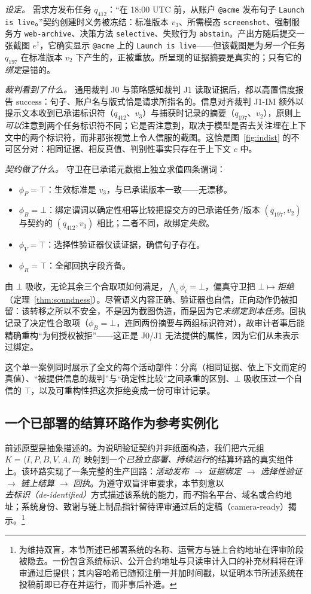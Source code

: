 \documentclass[11pt]{ctexart}
\begin{document}
\emph{设定。} 需求方发布任务 $q_{412}$：“在 18:00 UTC 前，从账户 \texttt{@acme} 发布句子 \texttt{Launch is live}。”契约创建时义务被冻结：标准版本 $v_3$、所需模态 \texttt{screenshot}、强制服务方 \texttt{web-archive}、决策方法 \texttt{selective}、失败行为 \texttt{abstain}。产出方随后提交一张截图 $e^\dagger$，它确实显示 \texttt{@acme} 上的 \texttt{Launch is live}——但该截图是为\emph{另一个}任务 $q_{197}$ 在标准版本 $v_2$ 下产生的，正被重放。所呈现的证据摘要是真实的；只有它的\emph{绑定}是错的。

\emph{裁判看到了什么。} 通用裁判 J0 与策略感知裁判 J1 读取证据后，都以高置信度报告 $\mathrm{success}$：句子、账户名与版式恰是请求所指名的。信息对齐裁判 J1-IM 额外以提示文本收到已承诺标识符（$q_{412}$、$v_3$）与捕获时记录的摘要（$q_{197}$、$v_2$），原则上\emph{可以}注意到两个任务标识符不同；它是否注意到，取决于模型是否去关注埋在上下文中的两个标识符，而非那张视觉上令人信服的截图。这恰是图~\ref{fig:indist} 的不可区分对：相同证据、相反真值、判别性事实只存在于上下文 $c$ 中。

\emph{契约做了什么。} 守卫在已承诺元数据上独立求值四条谓词：
\begin{itemize}
\item $\phi_P=\top$：生效标准是 $v_3$，与已承诺版本一致——无漂移。
\item $\phi_B=\bot$：绑定谓词以确定性相等比较把提交方的已承诺任务/版本 $(q_{197},v_2)$ 与契约的 $(q_{412},v_3)$ 相比；二者不同，故绑定\emph{失败}。
\item $\phi_V=\top$：选择性验证器仅读证据，确信句子存在。
\item $\phi_R=\top$：全部回执字段齐备。
\end{itemize}
由 $\bot$ 吸收，无论其余三个合取项如何满足，$\bigwedge_i\phi_i=\bot$，偏真守卫把 $\bot\mapsto$\emph{拒绝}（定理~\ref{thm:soundness}）。尽管语义内容正确、验证器也自信，正向动作仍被扣留：该转移之所以不安全，不是因为截图伪造，而是因为它\emph{未绑定到本任务}。回执记录了决定性合取项（$\phi_B=\bot$，连同两份摘要与两组标识符对），故审计者事后能精确重构“为何授权被拒”——这正是 J0/J1 无法提供的属性，因为它们从未表示过绑定。

这个单一案例同时展示了全文的每个活动部件：分离（相同证据、依上下文而定的真值）、“被提供信息的裁判”与“确定性比较”之间承重的区别、$\bot$ 吸收压过一个自信的 $\top$，以及可重构性把这次拒绝变成一份可审计记录。

\subsection{一个已部署的结算环路作为参考实例化}
\label{sec:instantiation}
前述原型是抽象描述的。为说明验证契约并非纸面构造，我们把六元组 $K=\langle I,P,B,V,A,R\rangle$ 映射到一个\emph{已独立部署、持续运行}的结算环路的真实组件上。该环路实现了一条完整的生产回路：\emph{活动发布 $\to$ 证据绑定 $\to$ 选择性验证 $\to$ 链上结算 $\to$ 回执}。为遵守双盲评审要求，本节刻意以\emph{去标识（de-identified）}方式描述该系统的能力，而\emph{不}指名平台、域名或合约地址；系统身份、致谢与链上制品指针留待评审通过后的定稿（camera-ready）揭示。\footnote{为维持双盲，本节所述已部署系统的名称、运营方与链上合约地址在评审阶段被隐去。一份包含系统标识、公开合约地址与只读审计入口的补充材料将在评审通过后提供；其内容哈希已随预注册一并加时间戳，以证明本节所述系统在投稿前即已存在并运行，而非事后补造。}
\end{document}
